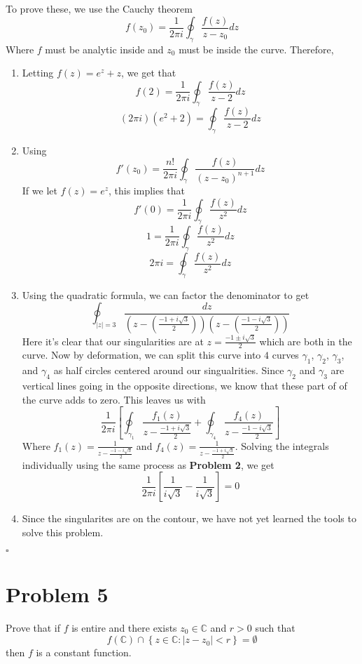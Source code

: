 \documentclass[12pt]{article}
\newcommand{\C}{\mathbb{C}}
\newcommand{\set}[1]{\left\{ #1\right\}}
\newenvironment{proof}{\noindent{\bf Proof.}}{\hfill $\square$\medskip}
\begin{document}
\begin{proof}
To prove these, we use the Cauchy theorem
$$f(z_{0})=\frac{1}{2\pi i}\oint_{\gamma}\frac{f(z)}{z-z_{0}}dz$$
Where $f$ must be analytic inside and $z_{0}$ must be inside the curve. Therefore,
\begin{enumerate}[label=\textbf{(\alph*)}]
    \item Letting $f(z)=e^{z}+z$, we get that
    $$f(2)=\frac{1}{2\pi i}\oint_{\gamma}\frac{f(z)}{z-2}dz$$
    $$(2\pi i)(e^{2}+2)=\oint_{\gamma}\frac{f(z)}{z-2}dz$$
    \item Using
    $$f'(z_0)=\frac{n!}{2\pi i}\oint_{\gamma}\frac{f(z)}{(z-z_{0})^{n+1}}dz$$
    If we let $f(z)=e^{z}$, this implies that
    $$f'(0)=\frac{1}{2\pi i}\oint_{\gamma}\frac{f(z)}{z^{2}}dz$$
    $$1=\frac{1}{2\pi i}\oint_{\gamma}\frac{f(z)}{z^{2}}dz$$
    $$2\pi i=\oint_{\gamma}\frac{f(z)}{z^{2}}dz$$
    \item Using the quadratic formula, we can factor the denominator to get
    $$\oint_{\left |z\right|=3}\frac{dz}{(z-(\frac{-1+i\sqrt{3}}{2}))(z-(\frac{-1-i\sqrt{3}}{2}))}$$
    Here it's clear that our singularities are at $z=\frac{-1\pm i\sqrt{3}}{2}$ which are both in the curve. Now by deformation, we can split this curve into $4$ curves $\gamma_{1}$, $\gamma_{2}$, $\gamma_{3}$, and $\gamma_{4}$ as half circles centered around our singualrities. Since $\gamma_{2}$ and $\gamma_{3}$ are vertical lines going in the opposite directions, we know that these part of of the curve adds to zero. This leaves us with
    $$\frac{1}{2\pi i}\left [\oint_{\gamma_{1}}\frac{f_{1}(z)}{z-\frac{-1+i\sqrt{3}}{2}}+\oint_{\gamma_{4}}\frac{f_{4}(z)}{z-\frac{-1-i\sqrt{3}}{2}}\right ]$$
    Where $f_{1}(z)=\frac{1}{z-\frac{-1-i\sqrt{3}}{2}}$ and $f_{4}(z)=\frac{1}{z-\frac{-1+i\sqrt{3}}{2}}$. Solving the integrals individually using the same process as \textbf{Problem 2}, we get
    $$\frac{1}{2\pi i}\left [\frac{1}{i\sqrt{3}}-\frac{1}{i\sqrt{3}}\right]=0$$
    \item Since the singularites are on the contour, we have not yet learned the tools to solve this problem.
\end{enumerate}
\end{proof}


\newpage
\section{Problem 5}
Prove that if $f$ is entire and there exists $z_{0}\in\C$ and $r>0$ such that
$$f(\C)\cap\set{z\in\C:\left |z-z_{0}\right |<r}=\emptyset$$
then $f$ is a constant function.
\end{document}
